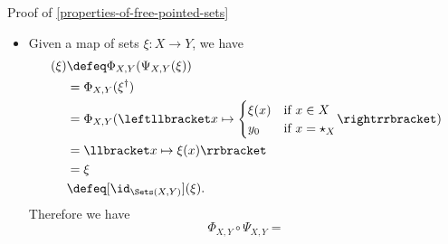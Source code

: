\begin{Proof}{Proof of \cref{properties-of-free-pointed-sets}}
\begin{itemize}
\begin{align*}
                                                 &=      \Psi_{X,Y}(\xi^{\dagger})\\%
                                                 &\defeq \leftllbracket x\mapsto{\begin{cases}\xi^{\dagger}(x)&\text{if $x\in X$}\\y_{0}&\text{if $x=\star_{X}$}\end{cases}}\rightrrbracket\\%
                                                 &=      \leftllbracket x\mapsto{\begin{cases}\xi(x)&\text{if $x\in X$}\\y_{0}&\text{if $x=\star_{X}$}\end{cases}}\rightrrbracket\\%
                                                 &=      \xi\\%
                                                 &\defeq [\id_{\Sets_{*}(X^{+},Y)}](\xi).%
            \end{align*}
            Therefore we have
            \[
                \Psi_{X,Y}\circ\Phi_{X,Y}%
                =%
                \id_{\Sets_{*}(X^{+},Y)}.%
            \]%
        \item\label{proof-of-properties-of-free-pointed-sets-adjointness-4}Given a map of sets $\xi\colon X\to Y$, we have
            \begin{align*}
                [\Phi_{X,Y}\circ\Psi_{X,Y}](\xi) &\defeq \Phi_{X,Y}(\Psi_{X,Y}(\xi))\\%
                                                 &=      \Phi_{X,Y}(\xi^{\dagger})\\%
                                                 &=      \Phi_{X,Y}(\leftllbracket x\mapsto{\begin{cases}\xi(x)&\text{if $x\in X$}\\y_{0}&\text{if $x=\star_{X}$}\end{cases}}\rightrrbracket)\\%
                                                 &=      \llbracket x\mapsto\xi(x)\rrbracket\\%
                                                 &=      \xi\\%
                                                 &\defeq [\id_{\Sets(X,Y)}](\xi).%
            \end{align*}
            Therefore we have
            \[
                \Phi_{X,Y}\circ\Psi_{X,Y}%
                =%
\]
\end{itemize}
\end{Proof}
